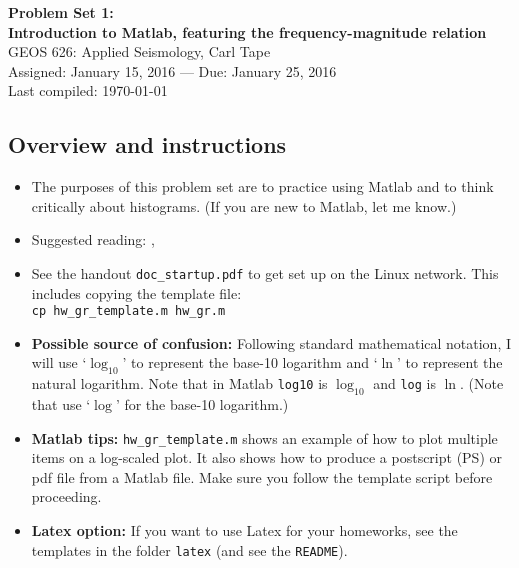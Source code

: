 \documentclass[11pt,titlepage,fleqn]{article}
\begin{document}

\begin{spacing}{1.2}
\centering
{\large \bf Problem Set 1: \\
Introduction to Matlab, featuring the frequency-magnitude relation} \\
GEOS 626: Applied Seismology, Carl Tape \\
Assigned: January 15, 2016 --- Due: January 25, 2016 \\
Last compiled: \today
\end{spacing}


\subsection*{Overview and instructions}

\begin{itemize}

\item The purposes of this problem set are to practice using Matlab and to think critically about histograms. (If you are new to Matlab, let me know.)

\item Suggested reading: \citet[][Section 4.7.1]{SteinWysession}, \citet{GutenbergRichter1944}

\item See the handout \verb+doc_startup.pdf+ to get set up on the Linux network. This includes copying the template file: \\
\verb+cp hw_gr_template.m hw_gr.m+

\item {\bf Possible source of confusion:} Following standard mathematical notation, I will use `$\log_{10}$' to represent the base-10 logarithm and `$\ln$' to represent the natural logarithm. Note that in Matlab \verb+log10+ is $\log_{10}$ and \verb+log+ is $\ln$. (Note that \citet{SteinWysession} use `$\log$' for the base-10 logarithm.)

\item {\bf Matlab tips:}
\verb+hw_gr_template.m+ shows an example of how to plot multiple items on a log-scaled plot. It also shows how to produce a postscript (PS) or pdf file from a Matlab file. Make sure you follow the template script before proceeding.

\item {\bf Latex option:}
If you want to use Latex for your homeworks, see the templates in the folder \verb+latex+ (and see the \verb+README+).

\end{itemize}
\end{document}
